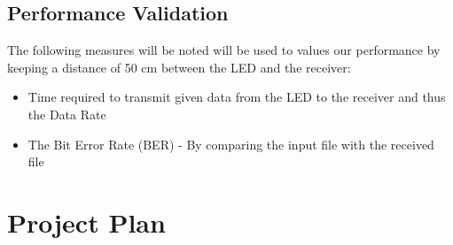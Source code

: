 \documentclass{article}
\begin{document}
\subsection{Performance Validation}
The following measures will be noted will be used to values our performance by keeping a distance of 50 cm between the LED and the receiver:
\begin{itemize}
\item Time required to transmit given data from the LED to the receiver and thus the Data Rate
\item The Bit Error Rate (BER) - By comparing the input file with the received file
\end{itemize}

\section{Project Plan}
\end{document}
